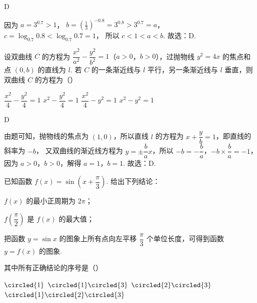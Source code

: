 \begin{answer}
D
\end{answer}

\begin{solution}
因为 \( a=3^{0.7}>1 \)，
\(b=\left( \frac13 \right)^{-0.8}=3^{0.8}>3^{0.7}=a\)，
\(c=\log_{0.7}0.8<\log_{0.7}0.7=1\)，
所以 \( c<1<a<b \).
故选：D.
\end{solution}

\begin{problem}
设双曲线 \(C\) 的方程为 \(\dfrac{x^2}{a^2}-\dfrac{y^2}{b^2}=1\)（\(a>0\)，\(b>0\)），过抛物线 \(y^2=4x\) 的焦点和点 \((0,b)\) 的直线为 \(l\). 若 \(C\) 的一条渐近线与 \(l\) 平行，另一条渐近线与 \(l\) 垂直，则双曲线 \(C\) 的方程为（\quad）

\choices
    {\(\dfrac{x^2}{4}-\dfrac{y^2}{4}=1\)}
    {\(x^2-\dfrac{y^2}{4}=1\)}
    {\(\dfrac{x^2}{4}-y^2=1\)}
    {\(x^2-y^2=1\)}
\end{problem}

\begin{answer}
D
\end{answer}

\begin{solution}
由题可知，抛物线的焦点为 \((1,0)\)，所以直线 \( l \) 的方程为 \( x+\dfrac{y}{b}=1 \)，即直线的斜率为 \(-b\)，
又双曲线的渐近线方程为 \( y=\pm\dfrac{b}{a}x \)，所以 \(-b=-\dfrac{b}{a}\)，\(-b\times\dfrac{b}{a}=-1\)，因为 \( a>0 \)，\( b>0 \)，解得 \( a=1 \)，\( b=1 \).
故选：D.
\end{solution}

\begin{problem}
已知函数 \(f(x)=\sin\left( x+\dfrac{\pi}{3} \right)\). 给出下列结论：

\begin{circlelist}
\item \(f(x)\) 的最小正周期为 \(2\pi\)；

\item \(f\left( \dfrac{\pi}{2} \right)\) 是 \(f(x)\) 的最大值；

\item 把函数 \(y=\sin x\) 的图象上所有点向左平移 \(\dfrac{\pi}{3}\) 个单位长度，可得到函数 \(y=f(x)\) 的图象.
\end{circlelist}

其中所有正确结论的序号是（\quad）

\choices
    {\(\circled{1}\)}
    {\(\circled{1}\circled{3}\)}
    {\(\circled{2}\circled{3}\)}
    {\(\circled{1}\circled{2}\circled{3}\)}
\end{problem}


